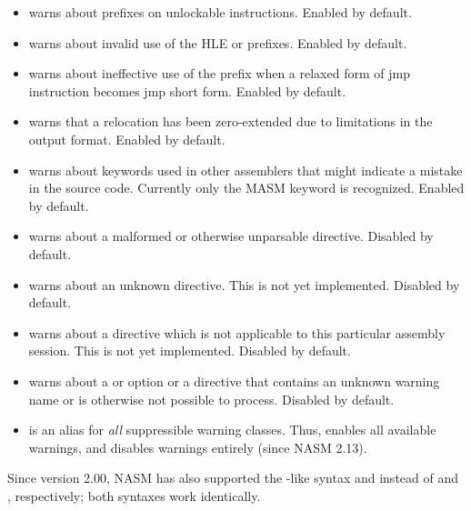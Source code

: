 \begin{itemize}
	\item {} warns about  prefixes on unlockable
	instructions. Enabled by default.

	\item {} warns about invalid use of the HLE 
	or  prefixes. Enabled by default.

	\item {} warns about ineffective use of the 
	prefix when a relaxed form of jmp instruction becomes jmp short form.
	Enabled by default.

	\item {} warns that a relocation has been
	zero-extended due to limitations in the output format. Enabled by default.  

	\item {} warns about keywords used in other assemblers that might
	indicate a mistake in the source code.  Currently only the MASM
	 keyword is recognized. Enabled by default.

	\item {} warns about a malformed or otherwise unparsable
	 directive. Disabled by default.

	\item {} warns about an unknown  directive.
	This is not yet implemented. Disabled by default.

	\item {} warns about a  directive which is
	not applicable to this particular assembly session. This is not yet
	implemented. Disabled by default.

	\item {} warns about a  or  option or a
	\code{[WARNING]} directive that contains an unknown warning name or is
	otherwise not possible to process. Disabled by default.

	\item {} is an alias for \emph{all} suppressible warning classes.
	Thus,  enables all available warnings, and 
	disables warnings entirely (since NASM 2.13).
\end{itemize}

Since version 2.00, NASM has also supported the -like syntax
 and  instead of
 and , respectively; both
syntaxes work identically.

